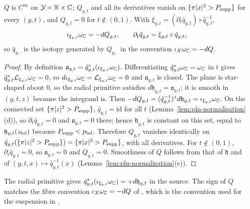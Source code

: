 \begin{proposition}\label{prop:pln-hamiltonian}
$Q$ is $C^\infty$ on $\mathcal Y\times\mathbb{R}\times\mathbb{C}$; $Q_{y,t}$ and all its derivatives vanish on $\{\pi|x|^2>P_{\rm supp}\}$ for every
$(y,t)$, and $Q_{y,t}=0$ for $t\notin(0,1)$. With $\xi_{y,t}=(\partial_t\hat q_{y,t})\circ\hat q_{y,t}^{-1}$,
\[
 \iota_{\xi_{y,t}}\omega_{\mathbb{C}}=-dQ_{y,t},\qquad \partial_t\hat q_{y,t}=\xi_{y,t}\circ\hat q_{y,t},
\]
so $\hat q_{y,\cdot}$ is the isotopy generated by $Q_{y,\cdot}$ in the convention $\iota_X\omega_{\mathbb{C}}=-dQ$.
\end{proposition}

\begin{proof}
By definition $\mathfrak a_{y,t}=\hat q_{y,t}^*(\iota_{\xi_{y,t}}\omega_{\mathbb{C}})$. Differentiating $\hat q_{y,t}^*\omega_{\mathbb{C}}=\omega_{\mathbb{C}}$ in $t$ gives
$\hat q_{y,t}^*\mathcal L_{\xi_{y,t}}\omega_{\mathbb{C}}=0$, so $d\iota_{\xi_{y,t}}\omega_{\mathbb{C}}=\mathcal L_{\xi_{y,t}}\omega_{\mathbb{C}}=0$ and $\mathfrak a_{y,t}$ is closed. The plane
is star-shaped about $0$, so the radial primitive satisfies $d\mathfrak h_{y,t}=\mathfrak a_{y,t}$; it is smooth in $(y,t,z)$ because the
integrand is. Then $-dQ_{y,t}=(\hat q_{y,t}^{-1})^*d\mathfrak h_{y,t}=\iota_{\xi_{y,t}}\omega_{\mathbb{C}}$. On the connected set
$\{\pi|z|^2>P_{\rm supp}\}$, $\hat q_{y,t}=\mathrm{id}$ for all $t$ (Lemma~\ref{lem:pln-normalisation}(d)), so $\partial_t\hat q_{y,t}=0$ and
$\mathfrak a_{y,t}=0$ there; hence $\mathfrak h_{y,t}$ is constant on this set, equal to $\mathfrak h_{y,t}(z_{\rm bd})$ because
$P_{\rm supp}<p_{\rm bd}$. Therefore $Q_{y,t}$ vanishes identically on $\hat q_{y,t}(\{\pi|z|^2>P_{\rm supp}\})=\{\pi|x|^2>P_{\rm supp}\}$, with all
derivatives. For $t\notin(0,1)$, $\partial_t\hat q_{y,t}=0$, so $\mathfrak a_{y,t}=0$ and $Q_{y,t}=0$. Smoothness of $Q$ follows from
that of $\mathfrak h$ and of $(y,t,x)\mapsto\hat q_{y,t}^{-1}(x)$ (Lemma~\ref{lem:pln-normalisation}(e)).
\end{proof}

The radial primitive gives $\hat q_{y,t}^*(\iota_{\xi_{y,t}}\omega_{\mathbb{C}})=+d\mathfrak h_{y,t}$ in the source. The sign of $Q$ matches the
fibre convention $\iota_X\omega_{\mathbb{C}}=-dQ$ of , which is the convention used for the suspension in
.

